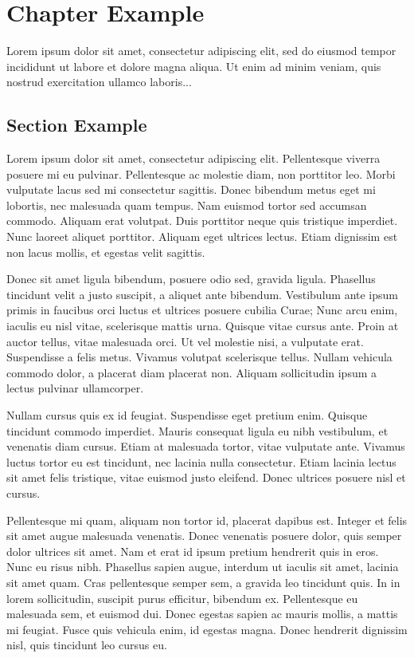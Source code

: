 \documentclass{arcanum}
\begin{document}
\chapter{Chapter Example}
Lorem ipsum dolor sit amet, consectetur adipiscing elit, sed do 
eiusmod tempor incididunt ut labore et dolore magna aliqua. Ut 
enim ad minim veniam, quis nostrud exercitation ullamco laboris...

\section{Section Example}
Lorem ipsum dolor sit amet, consectetur adipiscing elit. Pellentesque viverra
posuere mi eu pulvinar. Pellentesque ac molestie diam, non porttitor leo. Morbi
vulputate lacus sed mi consectetur sagittis. Donec bibendum metus eget mi lobortis,
nec malesuada quam tempus. Nam euismod tortor sed accumsan commodo. Aliquam erat
volutpat. Duis porttitor neque quis tristique imperdiet. Nunc laoreet aliquet
porttitor. Aliquam eget ultrices lectus. Etiam dignissim est non lacus mollis,
et egestas velit sagittis.

Donec sit amet ligula bibendum, posuere odio sed, gravida ligula. Phasellus tincidunt
velit a justo suscipit, a aliquet ante bibendum. Vestibulum ante ipsum primis in
faucibus orci luctus et ultrices posuere cubilia Curae; Nunc arcu enim, iaculis
eu nisl vitae, scelerisque mattis urna. Quisque vitae cursus ante. Proin at auctor
tellus, vitae malesuada orci. Ut vel molestie nisi, a vulputate erat. Suspendisse a
felis metus. Vivamus volutpat scelerisque tellus. Nullam vehicula commodo dolor,
a placerat diam placerat non. Aliquam sollicitudin ipsum a lectus pulvinar ullamcorper.

Nullam cursus quis ex id feugiat. Suspendisse eget pretium enim. Quisque
tincidunt commodo imperdiet. Mauris consequat ligula eu nibh vestibulum,
et venenatis diam cursus. Etiam at malesuada tortor, vitae vulputate ante.
Vivamus luctus tortor eu est tincidunt, nec lacinia nulla consectetur. Etiam
lacinia lectus sit amet felis tristique, vitae euismod justo eleifend. Donec
ultrices posuere nisl et cursus.

Pellentesque mi quam, aliquam non tortor id, placerat dapibus est. Integer et
felis sit amet augue malesuada venenatis. Donec venenatis posuere dolor, quis
semper dolor ultrices sit amet. Nam et erat id ipsum pretium hendrerit quis in
eros. Nunc eu risus nibh. Phasellus sapien augue, interdum ut iaculis sit amet,
lacinia sit amet quam. Cras pellentesque semper sem, a gravida leo tincidunt
quis. In in lorem sollicitudin, suscipit purus efficitur, bibendum ex.
Pellentesque eu malesuada sem, et euismod dui. Donec egestas sapien ac mauris
mollis, a mattis mi feugiat. Fusce quis vehicula enim, id egestas magna.
Donec hendrerit dignissim nisl, quis tincidunt leo cursus eu.
\end{document}
